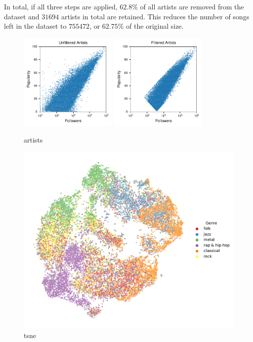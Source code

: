 \documentclass{article}
\begin{document}
In total, if all three steps are applied, $62.8\%$ of all artists are removed from the dataset and $31694$ artists in total are retained. This reduces the number of songs left in the dataset to $755472$, or $62.75\%$ of the original size.

\begin{figure}
  \centering
  \includegraphics[width=0.42\textwidth]{../figures/artists_unfiltered.pdf}
  \qquad
  \includegraphics[width=0.42\textwidth]{../figures/artists_filtered.pdf}
  \caption{artists}
  \label{fig:filtering}
\end{figure}

\begin{figure}
  \centering
  \includegraphics[width=\textwidth]{../figures/tsne_genres.pdf}
  \caption{tsne}
  \label{fig:tsne_genres}
\end{figure}
\end{document}
